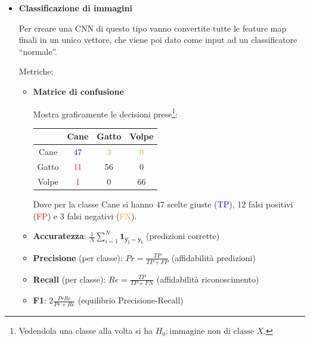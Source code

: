 \documentclass{article}
\begin{document}
\begin{itemize}
    \item \textbf{Classificazione di immagini}

        Per creare una CNN di questo tipo vanno convertite tutte le feature map finali in un unico vettore, che viene poi dato come input ad un classificatore ``normale''.

        Metriche:
        \begin{itemize}
            \item \textbf{Matrice di confusione}

                    Mostra graficamente le decisioni prese\footnote{Vedendola una classe alla volta si ha $H_0:\text{immagine non di classe }X$.}:

                    \begin{table}[ht]
                        \centering
                        \begin{tabular}{|c|c|c|c|}
                            \hline
                                   & Cane & Gatto & Volpe  \\
                            \hline
                            Cane   & \textcolor{blue}{47}   & \textcolor{orange}{3}     & \textcolor{orange}{0}       \\
                            \hline
                            Gatto  & \textcolor{red}{11}   & 56     & 0       \\
                            \hline
                            Volpe  & \textcolor{red}{1}   & 0     & 66        \\
                            \hline
                        \end{tabular}

                    \end{table}

                Dove per la classe Cane si hanno 47 scelte giuste (\textcolor{blue}{TP}), 12 falsi positivi (\textcolor{red}{FP}) e 3 falsi negativi (\textcolor{orange}{FN}).

                \vspace{5pt}

        \item \textbf{Accuratezza}: $\frac1N\sum_{i=1}^N\mathbf{1_{\hat{y_i}=y_i}}$ (predizioni corrette)
        \item \textbf{Precisione} (per classe): $Pr=\frac{TP}{TP+FP}$ (affidabilità predizioni)
        \item \textbf{Recall} (per classe): $Re=\frac{TP}{TP+FN}$ (affidabilità riconoscimento)
        \item \textbf{F1}: $2\frac{PrRe}{Pr+Re}$ (equilibrio Precisione-Recall)\newline
            

\end{itemize}
\end{itemize}
\end{document}
